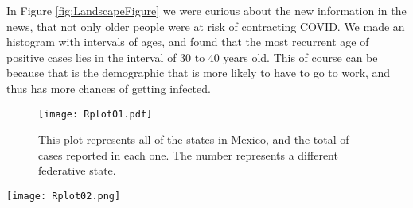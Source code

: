 \documentclass{article}
\begin{document}
In Figure \ref{fig:LandscapeFigure} we were curious about the new information in the news, that not only older people were at risk of contracting COVID. We made an histogram with intervals of ages, and found that the most recurrent age of positive cases lies in the interval of 30 to 40 years old. This of course can be because that is the demographic that is more likely to have to go to work, and thus has more chances of getting infected.\\

\begin{figure}[]
  \texttt{[image: Rplot01.pdf]}  
	\caption{This plot represents all of the states in Mexico, and the total of cases reported in each one. The number represents a different federative state.}
\label{fig3}
\end{figure}


\begin{sidewaysfigure}[]
    \texttt{[image: Rplot02.png]}
    \caption{Distribution of cases by age groups in Mexico.}
    \label{fig:LandscapeFigure}
\end{sidewaysfigure}












 
\end{document}
